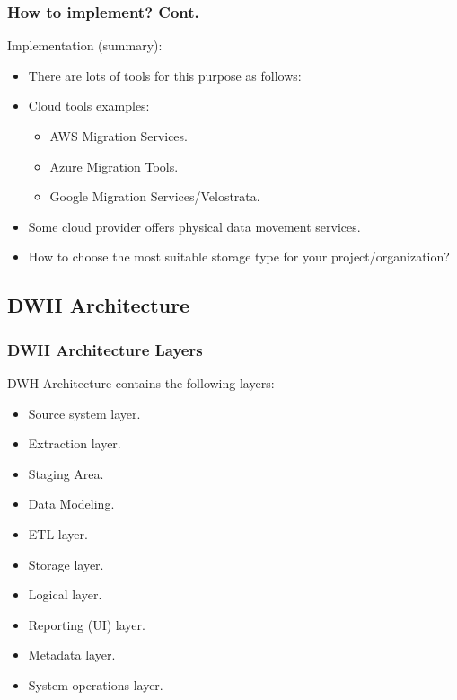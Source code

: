 \begin{frame}
\frametitle{How to implement? Cont.}
\begin{wideitemize}
	\item Implementation (summary):
	\begin{itemize}[<+->]
		\item There are lots of tools for this purpose as follows:
		\item Cloud tools examples:
		\begin{itemize}
			\item AWS Migration Services.
			\item Azure Migration Tools.
			\item Google Migration Services/Velostrata.
		\end{itemize}			
		\item Some cloud provider offers physical data movement services.
		\item How to choose the most suitable storage type for your project/organization?
	\end{itemize}
\end{wideitemize}
\end{frame}


\subsection{DWH Architecture}
\begin{frame}
\frametitle{DWH Architecture Layers}

\begin{wideitemize}
	\item DWH Architecture contains the following layers:
	\begin{itemize}[<+->]
		\item Source system layer.
		\item Extraction layer.
		\item Staging Area.
		\item Data Modeling.
		\item ETL layer.
		\item Storage layer.
		\item Logical layer.
		\item Reporting (UI) layer.
		\item Metadata layer.
		\item System operations layer.
	\end{itemize}	
\end{wideitemize}

\end{frame}

